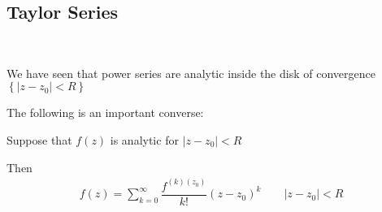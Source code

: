 \subsection{Taylor Series}\hfill\\
\par\bigskip
\noindent We have seen that power series are analytic inside the disk of convergence $\left\{\left|z-z_0\right|<R\right\}$
\par\bigskip
\noindent The following is an important converse:
\par\bigskip
\begin{theo}{}
  Suppose that $f(z)$ is analytic for $\left|z-z_0\right|<R$
  \par\bigskip
  \noindent Then
  \begin{equation*}
    \begin{gathered}
      f(z) = \sum_{k=0}^{\infty}\dfrac{f^{(k)(z_0)}}{k!}(z-z_0)^k\qquad\left|z-z_0\right|<R
    \end{gathered}
  \end{equation*}
\end{theo}
\newpage
